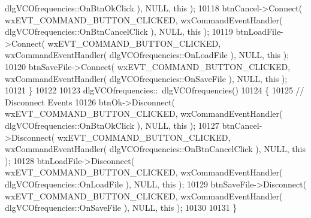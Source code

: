 \begin{DoxyCode}
      dlgVCOfrequencies::OnBtnOkClick ), NULL, \textcolor{keyword}{this} );
10118     btnCancel->Connect( wxEVT\_COMMAND\_BUTTON\_CLICKED, wxCommandEventHandler( 
      dlgVCOfrequencies::OnBtnCancelClick ), NULL, \textcolor{keyword}{this} );
10119     btnLoadFile->Connect( wxEVT\_COMMAND\_BUTTON\_CLICKED, wxCommandEventHandler( 
      dlgVCOfrequencies::OnLoadFile ), NULL, \textcolor{keyword}{this} );
10120     btnSaveFile->Connect( wxEVT\_COMMAND\_BUTTON\_CLICKED, wxCommandEventHandler( 
      dlgVCOfrequencies::OnSaveFile ), NULL, \textcolor{keyword}{this} );
10121 \}
10122 
10123 dlgVCOfrequencies::~dlgVCOfrequencies()
10124 \{
10125     \textcolor{comment}{// Disconnect Events}
10126     btnOk->Disconnect( wxEVT\_COMMAND\_BUTTON\_CLICKED, wxCommandEventHandler( 
      dlgVCOfrequencies::OnBtnOkClick ), NULL, \textcolor{keyword}{this} );
10127     btnCancel->Disconnect( wxEVT\_COMMAND\_BUTTON\_CLICKED, wxCommandEventHandler( 
      dlgVCOfrequencies::OnBtnCancelClick ), NULL, \textcolor{keyword}{this} );
10128     btnLoadFile->Disconnect( wxEVT\_COMMAND\_BUTTON\_CLICKED, wxCommandEventHandler( 
      dlgVCOfrequencies::OnLoadFile ), NULL, \textcolor{keyword}{this} );
10129     btnSaveFile->Disconnect( wxEVT\_COMMAND\_BUTTON\_CLICKED, wxCommandEventHandler( 
      dlgVCOfrequencies::OnSaveFile ), NULL, \textcolor{keyword}{this} );
10130     
10131 \}
\end{DoxyCode}
